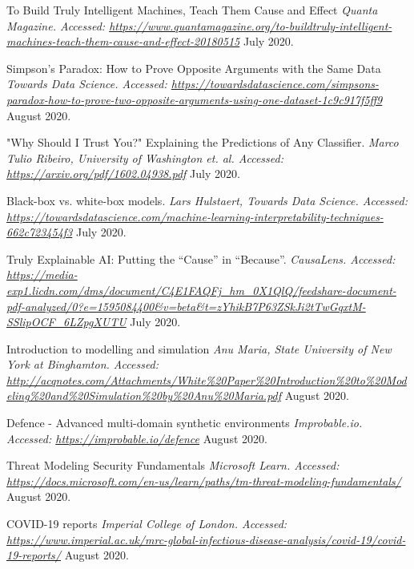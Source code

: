 \let\cleardoublepage\clearpage
\cleardoublepage
{}


\begin{thebibliography}{1}
\vspace*{15pt}


 To Build Truly Intelligent Machines, Teach Them Cause and Effect {\em Quanta Magazine. Accessed:  \url{https://www.quantamagazine.org/to-buildtruly-intelligent-machines-teach-them-cause-and-effect-20180515}} July 2020.

 Simpson’s Paradox: How to Prove Opposite Arguments with the Same Data {\em Towards Data Science. Accessed:  \url{https://towardsdatascience.com/simpsons-paradox-how-to-prove-two-opposite-arguments-using-one-dataset-1c9c917f5ff9}} August 2020.

  "Why Should I Trust You?" Explaining the Predictions of Any Classifier. {\em Marco Tulio Ribeiro, University of Washington et. al. Accessed:  \url{https://arxiv.org/pdf/1602.04938.pdf}} July 2020.

 Black-box vs. white-box models. {\em  Lars Hulstaert, Towards Data Science. Accessed:  \url{https://towardsdatascience.com/machine-learning-interpretability-techniques-662c723454f3}} July 2020.

 Truly Explainable AI: Putting the “Cause” in “Because”. {\em  CausaLens. Accessed:  \url{https://media-exp1.licdn.com/dms/document/C4E1FAQFj_hm_0X1QlQ/feedshare-document-pdf-analyzed/0?e=1595084400&v=beta&t=zYhikB7P63ZSkJi2tTwGqxtM-SSlipOCF_6LZpgXUTU}} July 2020.

 Introduction to modelling and simulation {\em Anu Maria, State University of New York at Binghamton. Accessed:  \url{http://acqnotes.com/Attachments/White\%20Paper\%20Introduction\%20to\%20Modeling\%20and\%20Simulation\%20by\%20Anu\%20Maria.pdf}} August 2020.

 Defence - Advanced multi-domain synthetic environments {\em Improbable.io. Accessed:  \url{https://improbable.io/defence}} August 2020.

 Threat Modeling Security Fundamentals {\em Microsoft Learn. Accessed:  \url{https://docs.microsoft.com/en-us/learn/paths/tm-threat-modeling-fundamentals/}} August 2020.

 COVID-19 reports {\em Imperial College of London. Accessed:  \url{https://www.imperial.ac.uk/mrc-global-infectious-disease-analysis/covid-19/covid-19-reports/}} August 2020.


\end{thebibliography}
